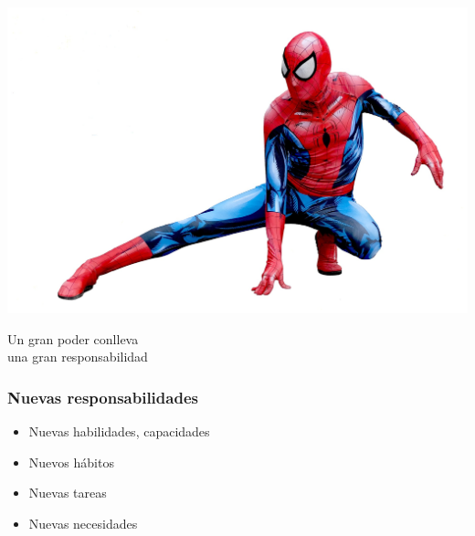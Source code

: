 \documentclass[17pt,aspectratio=169]{beamer}
\begin{document}


\begin{frame}

\includegraphics[height=.7\textheight]{figs/spiderman.jpg}

{\Large
\begin{center}
  Un gran poder conlleva \\
  una gran responsabilidad \\
\end{center}
}

\end{frame}


\begin{frame}
\frametitle{Nuevas responsabilidades}

\begin{itemize}
\item Nuevas habilidades, capacidades
\item Nuevos hábitos
\item Nuevas tareas
\item Nuevas necesidades
\end{itemize}

\end{frame}

\end{document}
